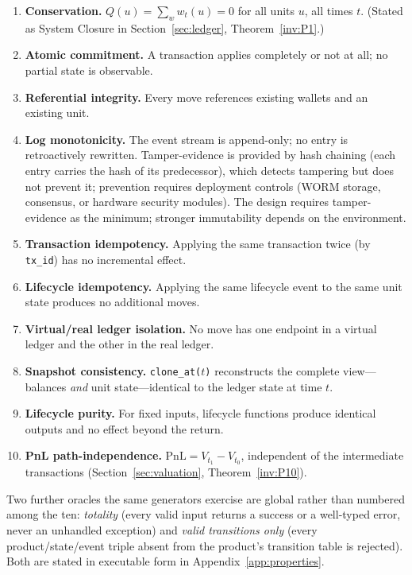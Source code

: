 \begin{enumerate}
\item[\textbf{P1}] \textbf{Conservation.} $Q(u)=\sum_w w_t(u)=0$ for all units $u$, all times $t$. (Stated as System Closure in Section~\ref{sec:ledger}, Theorem~\ref{inv:P1}.)
\item[\textbf{P2}] \textbf{Atomic commitment.}\label{inv:P2} A transaction applies completely or not at all; no partial state is observable.
\item[\textbf{P3}] \textbf{Referential integrity.}\label{inv:P3} Every move references existing wallets and an existing unit.
\item[\textbf{P4}] \textbf{Log monotonicity.}\label{inv:P4} The event stream is append-only; no entry is retroactively rewritten. Tamper-evidence is provided by hash chaining (each entry carries the hash of its predecessor), which detects tampering but does not prevent it; prevention requires deployment controls (WORM storage, consensus, or hardware security modules). The design requires tamper-evidence as the minimum; stronger immutability depends on the environment.
\item[\textbf{P5}] \textbf{Transaction idempotency.}\label{inv:P5} Applying the same transaction twice (by \texttt{tx\_id}) has no incremental effect.
\item[\textbf{P6}] \textbf{Lifecycle idempotency.}\label{inv:P6} Applying the same lifecycle event to the same unit state produces no additional moves.
\item[\textbf{P7}] \textbf{Virtual/real ledger isolation.}\label{inv:P7} No move has one endpoint in a virtual ledger and the other in the real ledger.
\item[\textbf{P8}] \textbf{Snapshot consistency.}\label{inv:P8} \texttt{clone\_at($t$)} reconstructs the complete view---balances \emph{and} unit state---identical to the ledger state at time $t$.
\item[\textbf{P9}] \textbf{Lifecycle purity.}\label{inv:P9} For fixed inputs, lifecycle functions produce identical outputs and no effect beyond the return.
\item[\textbf{P10}] \textbf{PnL path-independence.} $\mathrm{PnL}=V_{t_1}-V_{t_0}$, independent of the intermediate transactions (Section~\ref{sec:valuation}, Theorem~\ref{inv:P10}).
\end{enumerate}

Two further oracles the same generators exercise are global rather than numbered among the ten: \emph{totality} (every valid input returns a success or a well-typed error, never an unhandled exception) and \emph{valid transitions only} (every product/state/event triple absent from the product's transition table is rejected). Both are stated in executable form in Appendix~\ref{app:properties}.

